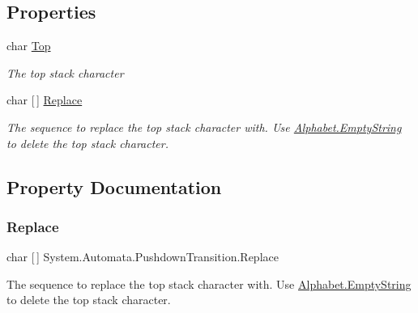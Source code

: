 \subsection*{Properties}
\begin{DoxyCompactItemize}
\item 
char \mbox{\hyperlink{class_system_1_1_automata_1_1_pushdown_transition_a956fe648291a21855c2d151668fd2411}{Top}}
\begin{DoxyCompactList}\small\item\em The top stack character \end{DoxyCompactList}\item 
char \mbox{[}$\,$\mbox{]} \mbox{\hyperlink{class_system_1_1_automata_1_1_pushdown_transition_a8294a0ad226f3594492792271d178e06}{Replace}}
\begin{DoxyCompactList}\small\item\em The sequence to replace the top stack character with. Use \mbox{\hyperlink{class_system_1_1_automata_1_1_alphabet_aa3f8c16de4596ed24f2fe0fb77e7493c}{Alphabet.\+Empty\+String}} to delete the top stack character. \end{DoxyCompactList}\end{DoxyCompactItemize}


\subsection{Property Documentation}
\mbox{\label{class_system_1_1_automata_1_1_pushdown_transition_a8294a0ad226f3594492792271d178e06}} 
\subsubsection{\texorpdfstring{Replace}{Replace}}
{\footnotesize\ttfamily char \mbox{[}$\,$\mbox{]} System.\+Automata.\+Pushdown\+Transition.\+Replace\hspace{0.3cm}{\ttfamily [get]}}



The sequence to replace the top stack character with. Use \mbox{\hyperlink{class_system_1_1_automata_1_1_alphabet_aa3f8c16de4596ed24f2fe0fb77e7493c}{Alphabet.\+Empty\+String}} to delete the top stack character. 


